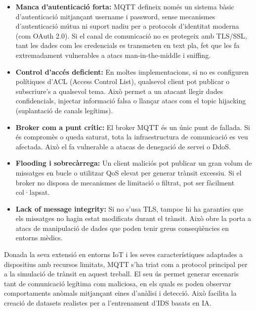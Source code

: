   \begin{itemize}  
      \item \textbf{Manca d’autenticació forta:} MQTT defineix només un sistema bàsic d’autenticació mitjançant username i password, sense mecanismes d’autenticació mútua ni suport nadiu per a protocols d’identitat moderna (com OAuth 2.0). Si el canal de comunicació no es protegeix amb TLS/SSL, tant les dades com les credencials es transmeten en text pla, fet que les fa extremadament vulnerables a atacs man-in-the-middle i sniffing.
      \item \textbf{Control d’accés deficient:} En moltes implementacions, si no es configuren polítiques d’ACL (Access Control List), qualsevol client pot publicar o subscriure’s a qualsevol tema. Això permet a un atacant llegir dades confidencials, injectar informació falsa o llançar atacs com el topic hijacking (suplantació de canals legítims).
      \item \textbf{Broker com a punt crític:} El broker MQTT és un únic punt de fallada. Si és compromès o queda saturat, tota la infraestructura de comunicació es veu afectada. Això el fa vulnerable a atacas de denegació de servei o DdoS. 
      \item \textbf{Flooding i sobrecàrrega:} Un client maliciós pot publicar un gran volum de missatges en bucle o utilitzar QoS elevat per generar trànsit excessiu. Si el broker no disposa de mecanismes de limitació o filtrat, pot ser fàcilment col·lapsat.
      \item \textbf{Lack of message integrity:} Si no s’usa TLS, tampoc hi ha garanties que els missatges no hagin estat modificats durant el trànsit. Això obre la porta a atacs de manipulació de dades que poden tenir greus conseqüències en entorns mèdics.
  \end{itemize}
  Donada la seva extensió en entorns IoT i les seves característiques adaptades a dispositius amb recursos limitats, MQTT s’ha triat com a protocol principal per a la simulació de trànsit en aquest treball. El seu ús permet generar escenaris tant de comunicació legítima com maliciosa, en els quals es poden observar comportaments anòmals mitjançant eines d’anàlisi i detecció. Això facilita la creació de datasets realistes per a l’entrenament d’IDS basats en IA.
    
